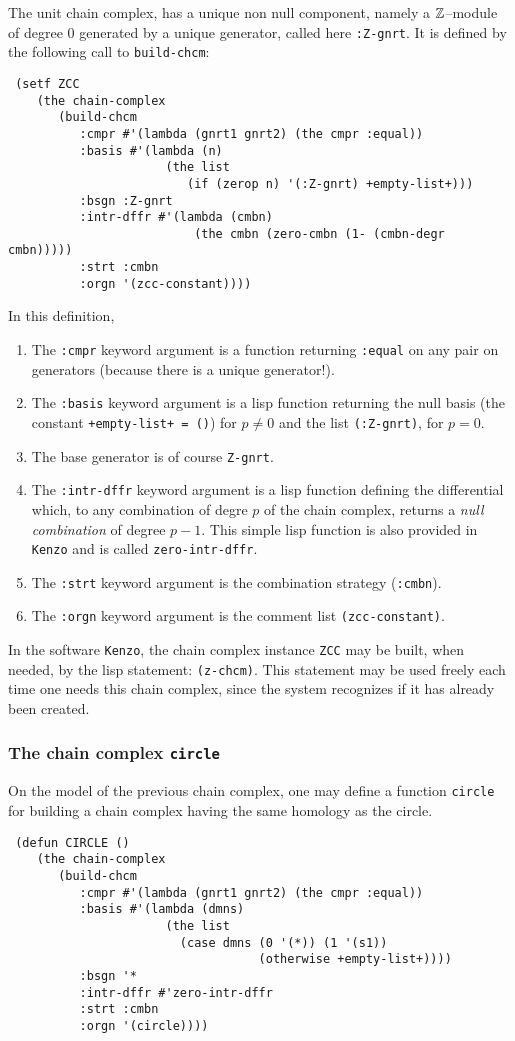 The unit chain complex, has a unique non null component,
namely a ${\mathbb{Z}}$--module of degree $0$ generated by a unique generator,
called here {\tt :Z-gnrt}. It is defined by the following call to {\tt build-chcm}:
{\footnotesize\begin{verbatim}
 (setf ZCC
    (the chain-complex
       (build-chcm
          :cmpr #'(lambda (gnrt1 gnrt2) (the cmpr :equal))
          :basis #'(lambda (n)
                      (the list
                         (if (zerop n) '(:Z-gnrt) +empty-list+)))
          :bsgn :Z-gnrt
          :intr-dffr #'(lambda (cmbn)
                          (the cmbn (zero-cmbn (1- (cmbn-degr cmbn)))))
          :strt :cmbn
          :orgn '(zcc-constant))))
\end{verbatim}
}
In this definition,
\begin{enumerate}
\item The {\tt :cmpr} keyword   argument is a function  returning {\tt :equal} on any pair
on generators (because there is a unique generator!).
\item The {\tt :basis} keyword argument is a lisp function returning the null basis
(the constant {\tt +empty-list+ = ()}) for $p \not= 0$ and
the list {\tt (:Z-gnrt)}, for $p=0$.
\item The base generator is of course {\tt Z-gnrt}.
\item The {\tt :intr-dffr} keyword argument is a lisp function defining the differential  which,
to any combination of degre $p$
of the chain complex, returns a {\em null combination} of degree $p-1$. This simple lisp function
is also provided in {\tt Kenzo} and is called {\tt zero-intr-dffr}.
\item The {\tt :strt} keyword argument is the combination strategy ({\tt :cmbn}).
\item The {\tt :orgn} keyword argument is the comment list {\tt (zcc-constant)}.
\end{enumerate}
In the software {\tt Kenzo}, the chain complex instance {\tt ZCC} may be built, when needed,
by the lisp statement: {\tt (z-chcm)}. This statement may be used freely each time
one needs this chain complex, since the system  recognizes if it has already been
created.

\subsubsection {The chain complex {\tt circle}}

On the model of the previous chain complex, one may define a function {\tt circle} for building a chain complex
having the same homology as the circle.
{\footnotesize\begin{verbatim}
 (defun CIRCLE ()
    (the chain-complex
       (build-chcm
          :cmpr #'(lambda (gnrt1 gnrt2) (the cmpr :equal))
          :basis #'(lambda (dmns)
                      (the list
                        (case dmns (0 '(*)) (1 '(s1))
                                   (otherwise +empty-list+))))
          :bsgn '*
          :intr-dffr #'zero-intr-dffr
          :strt :cmbn
          :orgn '(circle))))
\end{verbatim}
}

